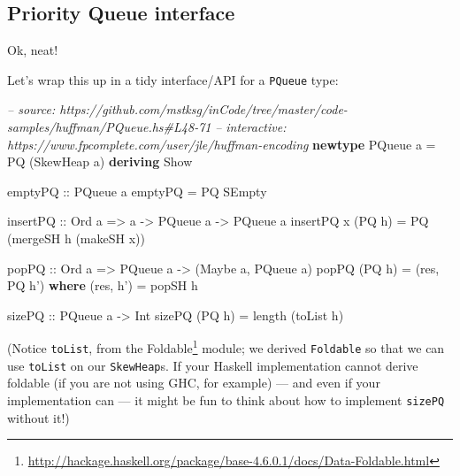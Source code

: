 \documentclass[]{article}
\newenvironment{Shaded}{}{}
\newcommand{\KeywordTok}[1]{\textcolor[rgb]{0.00,0.44,0.13}{\textbf{#1}}}
\newcommand{\DataTypeTok}[1]{\textcolor[rgb]{0.56,0.13,0.00}{#1}}
\newcommand{\CommentTok}[1]{\textcolor[rgb]{0.38,0.63,0.69}{\textit{#1}}}
\newcommand{\OtherTok}[1]{\textcolor[rgb]{0.00,0.44,0.13}{#1}}
\newcommand{\FunctionTok}[1]{\textcolor[rgb]{0.02,0.16,0.49}{#1}}
\newcommand{\NormalTok}[1]{#1}
\renewcommand{\href}[2]{#2\footnote{\url{#1}}}
\begin{document}
\subsection{Priority Queue interface}\label{priority-queue-interface}

Ok, neat!

Let's wrap this up in a tidy interface/API for a \texttt{PQueue} type:

\begin{Shaded}
\begin{Highlighting}[]
\CommentTok{-- source: https://github.com/mstksg/inCode/tree/master/code-samples/huffman/PQueue.hs#L48-71}
\CommentTok{-- interactive: https://www.fpcomplete.com/user/jle/huffman-encoding}
\KeywordTok{newtype} \DataTypeTok{PQueue}\NormalTok{ a }\FunctionTok{=} \DataTypeTok{PQ}\NormalTok{ (}\DataTypeTok{SkewHeap}\NormalTok{ a) }\KeywordTok{deriving} \DataTypeTok{Show}

\OtherTok{emptyPQ ::} \DataTypeTok{PQueue}\NormalTok{ a}
\NormalTok{emptyPQ }\FunctionTok{=} \DataTypeTok{PQ} \DataTypeTok{SEmpty}

\OtherTok{insertPQ ::} \DataTypeTok{Ord}\NormalTok{ a }\OtherTok{=>}\NormalTok{ a }\OtherTok{->} \DataTypeTok{PQueue}\NormalTok{ a }\OtherTok{->} \DataTypeTok{PQueue}\NormalTok{ a}
\NormalTok{insertPQ x (}\DataTypeTok{PQ}\NormalTok{ h) }\FunctionTok{=} \DataTypeTok{PQ}\NormalTok{ (mergeSH h (makeSH x))}

\OtherTok{popPQ ::} \DataTypeTok{Ord}\NormalTok{ a }\OtherTok{=>} \DataTypeTok{PQueue}\NormalTok{ a }\OtherTok{->}\NormalTok{ (}\DataTypeTok{Maybe}\NormalTok{ a, }\DataTypeTok{PQueue}\NormalTok{ a)}
\NormalTok{popPQ (}\DataTypeTok{PQ}\NormalTok{ h) }\FunctionTok{=}\NormalTok{ (res, }\DataTypeTok{PQ}\NormalTok{ h')}
  \KeywordTok{where}
\NormalTok{    (res, h') }\FunctionTok{=}\NormalTok{ popSH h}

\OtherTok{sizePQ ::} \DataTypeTok{PQueue}\NormalTok{ a }\OtherTok{->} \DataTypeTok{Int}
\NormalTok{sizePQ (}\DataTypeTok{PQ}\NormalTok{ h) }\FunctionTok{=}\NormalTok{ length (toList h)}
\end{Highlighting}
\end{Shaded}

(Notice \texttt{toList}, from the
\href{http://hackage.haskell.org/package/base-4.6.0.1/docs/Data-Foldable.html}{Foldable}
module; we derived \texttt{Foldable} so that we can use \texttt{toList} on our
\texttt{SkewHeap}s. If your Haskell implementation cannot derive foldable (if
you are not using GHC, for example) --- and even if your implementation can ---
it might be fun to think about how to implement \texttt{sizePQ} without it!)
\end{document}
